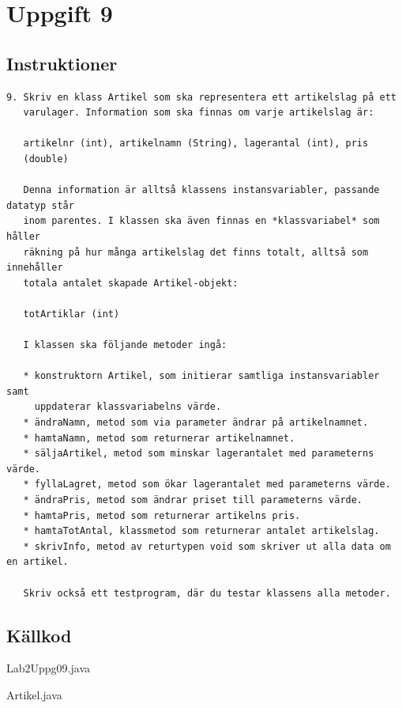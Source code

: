 \section{Uppgift 9}\label{sec:uppg09}

\subsection{Instruktioner}
\begin{verbatim}
9. Skriv en klass Artikel som ska representera ett artikelslag på ett
   varulager. Information som ska finnas om varje artikelslag är:

   artikelnr (int), artikelnamn (String), lagerantal (int), pris
   (double)

   Denna information är alltså klassens instansvariabler, passande datatyp står
   inom parentes. I klassen ska även finnas en *klassvariabel* som håller
   räkning på hur många artikelslag det finns totalt, alltså som innehåller
   totala antalet skapade Artikel-objekt:

   totArtiklar (int)

   I klassen ska följande metoder ingå:

   * konstruktorn Artikel, som initierar samtliga instansvariabler samt
     uppdaterar klassvariabelns värde.
   * ändraNamn, metod som via parameter ändrar på artikelnamnet.
   * hamtaNamn, metod som returnerar artikelnamnet.
   * säljaArtikel, metod som minskar lagerantalet med parameterns värde.
   * fyllaLagret, metod som ökar lagerantalet med parameterns värde.
   * ändraPris, metod som ändrar priset till parameterns värde.
   * hamtaPris, metod som returnerar artikelns pris.
   * hamtaTotAntal, klassmetod som returnerar antalet artikelslag.
   * skrivInfo, metod av returtypen void som skriver ut alla data om en artikel.

   Skriv också ett testprogram, där du testar klassens alla metoder.
\end{verbatim}


\subsection{Källkod}
\caption{Lab2Uppg09.java}
\label{src:uppg09}

\caption{Artikel.java}
\label{src:artikel}


